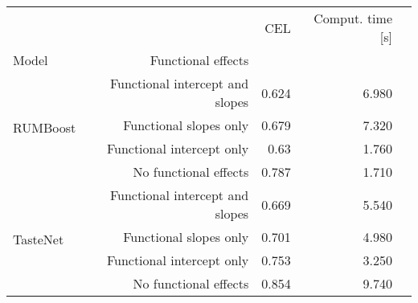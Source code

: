 \begin{tabular}{lrrrr}
\toprule
 &  & CEL & Comput. time [s] \\
Model & Functional effects &  &  \\
\midrule
\multirow[t]{4}{*}{RUMBoost} & Functional intercept and slopes & 0.624 & 6.980 \\
 & Functional slopes only & 0.679 & 7.320 \\
 & Functional intercept only & 0.63 & 1.760 \\
 & No functional effects & 0.787 & 1.710 \\
\cline{1-4}
\multirow[t]{4}{*}{TasteNet} & Functional intercept and slopes & 0.669 & 5.540 \\
 & Functional slopes only & 0.701 & 4.980 \\
 & Functional intercept only & 0.753 & 3.250 \\
 & No functional effects & 0.854 & 9.740 \\
\cline{1-4}
\bottomrule
\end{tabular}
